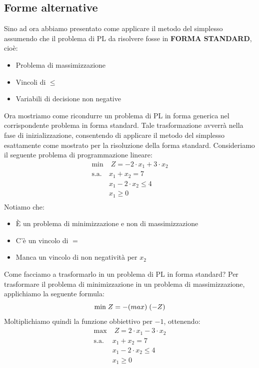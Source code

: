 \documentclass[12pt]{article}
\begin{document}
\subsection{Forme alternative}
Sino ad ora abbiamo presentato come applicare il metodo del simplesso assumendo che il problema di PL da risolvere fosse in \textbf{FORMA STANDARD}, cioè:
\begin{itemize}
    \item Problema di massimizzazione
    \item Vincoli di $\leq$
    \item Variabili di decisione non negative
\end{itemize}
Ora mostriamo come ricondurre un problema di PL in forma generica nel corrispondente problema in forma standard.
Tale trasformazione avverrà nella fase di inizializzazione, consentendo di applicare il metodo del simplesso esattamente come mostrato per la risoluzione della forma standard.
Consideriamo il seguente problema di programmazione lineare:
\begin{equation*}
    \begin{array}{ll}
        \displaystyle \textrm{min} & \; Z = -2 \cdot x_1 + 3 \cdot x_2\\
        \textrm{s.a.} & x_1 + x_2 = 7\\
        \phantom{} & x_1 - 2 \cdot x_2 \leq 4\\
        \phantom{} & x_1 \geq 0 \\
    \end{array}
\end{equation*}
Notiamo che:
\begin{itemize}
    \item È un problema di minimizzazione e non di massimizzazione
    \item C'è un vincolo di $=$
    \item Manca un vincolo di non negatività per $x_2$
\end{itemize}
Come facciamo a trasformarlo in un problema di PL in forma standard?
Per trasformare il problema di minimizzazione in un problema di massimizzazione, applichiamo la seguente formula:
$$\textrm{min} \; Z = -\textrm(max)\;(-Z)$$
Moltiplichiamo quindi la funzione obbiettivo per $-1$, ottenendo:
\begin{equation*}
    \begin{array}{ll}
        \displaystyle \textrm{max} & \; Z = 2 \cdot x_1 - 3 \cdot x_2\\
        \textrm{s.a.} & x_1 + x_2 = 7\\
        \phantom{} & x_1 - 2 \cdot x_2 \leq 4\\
        \phantom{} & x_1 \geq 0 \\
    \end{array}
\end{equation*}
\end{document}
